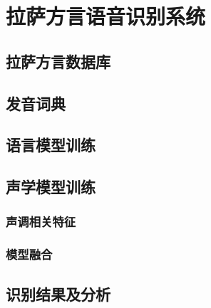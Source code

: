 ﻿%

\chapter{拉萨方言语音识别系统}
\section{拉萨方言数据库}
\section{发音词典}
\section{语言模型训练}
\section{声学模型训练}
\subsection{声调相关特征}
\subsection{模型融合}
\section{识别结果及分析}
